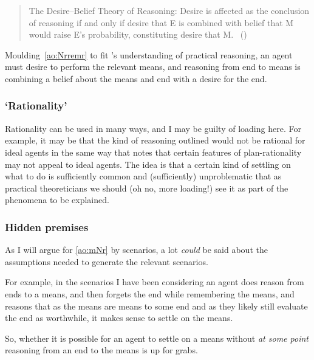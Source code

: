 \documentclass[10pt]{article}
\newcommand{\hozlinedash}[0]{%
  \noindent\hdashrule[0.5ex][c]{\textwidth}{.1pt}{2.5pt}
}
\begin{document}
\begin{quote}
  The Desire–Belief Theory of Reasoning: Desire is affected as the conclusion of reasoning if and only if desire that E is combined with belief that M would raise E’s probability, constituting desire that M.\nolinebreak
  \mbox{ }\hfill\mbox{(\citeyear[39]{Sinhababu:2017aa})}
\end{quote}

Moulding~\ref{ao:Nrremr} to fit \citeauthor{Sinhababu:2017aa}'s understanding of practical reasoning, an agent must desire to perform the relevant means, and reasoning from end to means is combining a belief about the means and end with a desire for the end.

\hozlinedash

\subsubsection*{`Rationality'}
\label{sec:note-rationality}

Rationality can be used in many ways, and I may be guilty of loading here.
For example, it may be that the kind of reasoning outlined would not be rational for ideal agents in the same way that \citeauthor{Bratman:1987aa} notes that certain features of plan-rationality may not appeal to ideal agents.
The idea is that a certain kind of settling on what to do is sufficiently common and (sufficiently) unproblematic that as practical theoreticians we should (oh no, more loading!) see it as part of the phenomena to be explained.

\hozlinedash

\subsubsection*{Hidden premises}
\label{sec:hidden-premises}

As I will argue for \ref{ao:mNr} by scenarios, a lot \emph{could} be said about the assumptions needed to generate the relevant scenarios.

For example, in the scenarios I have been considering an agent does reason from ends to a means, and then forgets the end while remembering the means, and reasons that as the means are means to some end and as they likely still evaluate the end as worthwhile, it makes sense to settle on the means.

So, whether it is possible for an agent to settle on a means without \emph{at some point} reasoning from an end to the means is up for grabs.
\end{document}
